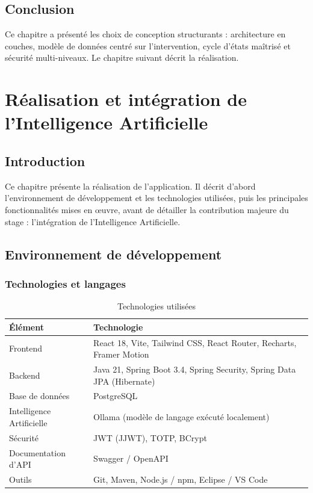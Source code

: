 \section{Conclusion}
Ce chapitre a présenté les choix de conception structurants : architecture en couches, modèle de données centré sur l'intervention, cycle d'états maîtrisé et sécurité multi-niveaux. Le chapitre suivant décrit la réalisation.


\chapter{Réalisation et intégration de l'Intelligence Artificielle}

\section{Introduction}
Ce chapitre présente la réalisation de l'application. Il décrit d'abord l'environnement de développement et les technologies utilisées, puis les principales fonctionnalités mises en œuvre, avant de détailler la contribution majeure du stage : l'intégration de l'Intelligence Artificielle.

\section{Environnement de développement}
\subsection{Technologies et langages}
\begin{table}[H]
\centering
\caption{Technologies utilisées}
\begin{tabularx}{\textwidth}{l X}
\toprule
\textbf{Élément} & \textbf{Technologie} \\
\midrule
Frontend & React 18, Vite, Tailwind CSS, React Router, Recharts, Framer Motion \\
Backend & Java 21, Spring Boot 3.4, Spring Security, Spring Data JPA (Hibernate) \\
Base de données & PostgreSQL \\
Intelligence Artificielle & Ollama (modèle de langage exécuté localement) \\
Sécurité & JWT (JJWT), TOTP, BCrypt \\
Documentation d'API & Swagger / OpenAPI \\
Outils & Git, Maven, Node.js / npm, Eclipse / VS Code \\
\bottomrule
\end{tabularx}
\label{tab:techno}
\end{table}

